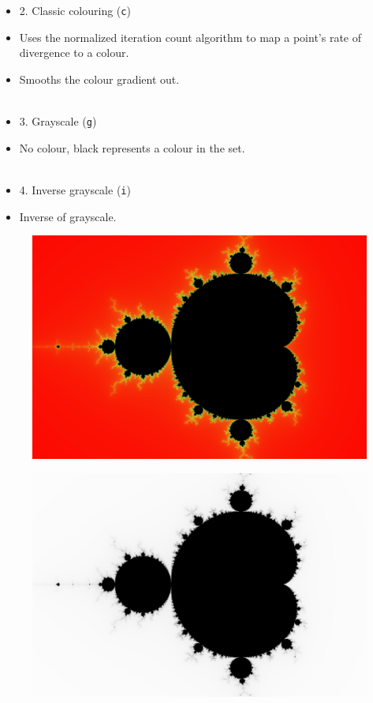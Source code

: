 \documentclass{beamer}
\begin{document}
\frame
{
\begin{itemize}
\item <1-> 2. Classic colouring (\texttt{c})
\item <2-> Uses the normalized iteration count algorithm to map a point's rate of divergence to a colour.
\item <3-> Smooths the colour gradient out. \\\text{}\\
\item <4-> 3. Grayscale (\texttt{g})
\item <5-> No colour, black represents a colour in the set. \\\text{}\\
\item <6-> 4. Inverse grayscale (\texttt{i})
\item <7-> Inverse of grayscale.
\end{itemize}
}

\frame
{
\begin{figure}
\centering
\includegraphics[scale=0.3]{presentation_images/classic_colouring} 
\end{figure}
}

\frame
{
\begin{figure}
\centering
\includegraphics[scale=0.3]{presentation_images/grayscale} 
\end{figure}
}
\end{document}
